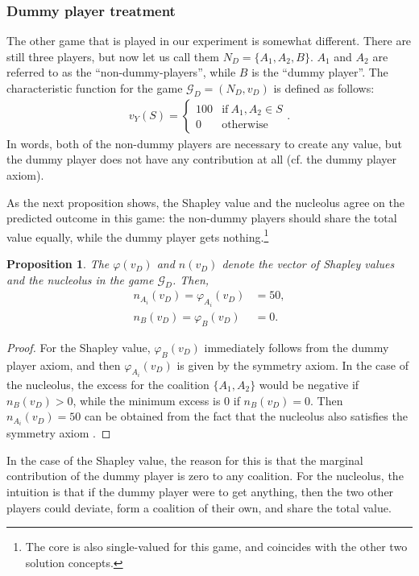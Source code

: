 \documentclass[12pt]{article}
\newtheorem{proposition}{Proposition}
\begin{document}
\subsubsection{Dummy player treatment} \label{explanation_dummy_player_treatment}

The other game that is played in our experiment is somewhat different. There are still three players, but now let us call them $N_D = \{A_1, A_2, B\}$. $A_1$ and $A_2$ are referred to as the ``non-dummy-players'', while $B$ is the ``dummy player''. The characteristic function for the game $\mathcal{G}_D = (N_D, v_D)$ is defined as follows:
\begin{align*}
    v_Y(S) = \begin{cases}
        100 & \text{if}\ A_1, A_2 \in S \\
        0 & \text{otherwise}
    \end{cases}.
\end{align*}
In words, both of the non-dummy players are necessary to create any value, but the dummy player does not have any contribution at all (cf. the dummy player axiom).

As the next proposition shows, the Shapley value and the nucleolus agree on the predicted outcome in this game: the non-dummy players should share the total value equally, while the dummy player gets nothing.\footnote{The core is also single-valued for this game, and coincides with the other two solution concepts.}
\begin{proposition}
    \label{prop:dummy_player}
    The $\varphi(v_D)$ and $n(v_D)$ denote the vector of Shapley values and the nucleolus in the game $\mathcal{G}_D$. Then,
    \begin{align*}
        n_{A_i}(v_D) = \varphi_{A_i}(v_D) &= 50, \\
        n_{B}(v_D) = \varphi_{B}(v_D) &= 0.
    \end{align*}
\end{proposition}
\begin{proof}
    For the Shapley value, $\varphi_{B}(v_D)$ immediately follows from the dummy player axiom, and then $\varphi_{A_i}(v_D)$ is given by the symmetry axiom. In the case of the nucleolus, the excess for the coalition $\{A_1, A_2\}$ would be negative if $n_{B}(v_D) > 0$, while the minimum excess is 0 if $n_{B}(v_D) = 0$. Then $n_{A_i}(v_D) = 50$ can be obtained from the fact that the nucleolus also satisfies the symmetry axiom \parencite{snijders1995axiomatization}.
\end{proof}
In the case of the Shapley value, the reason for this is that the marginal contribution of the dummy player is zero to any coalition. For the nucleolus, the intuition is that if the dummy player were to get anything, then the two other players could deviate, form a coalition of their own, and share the total value.
\end{document}
